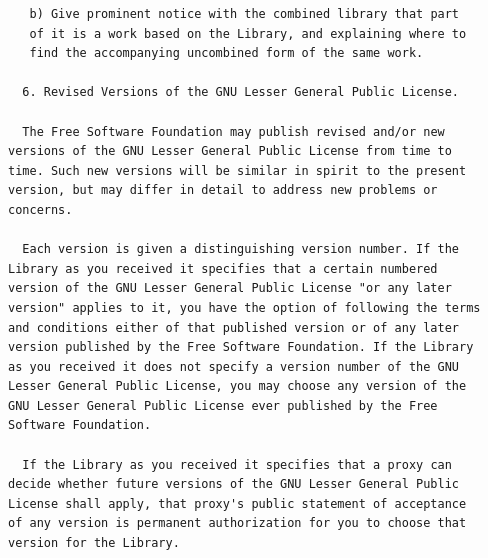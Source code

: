 \documentclass[11pt,twoside,fleqn,openright,titlepage]{cslreport}
\begin{document}
\begin{small}
\begin{verbatim}
   b) Give prominent notice with the combined library that part
   of it is a work based on the Library, and explaining where to
   find the accompanying uncombined form of the same work.

  6. Revised Versions of the GNU Lesser General Public License.

  The Free Software Foundation may publish revised and/or new
versions of the GNU Lesser General Public License from time to 
time. Such new versions will be similar in spirit to the present
version, but may differ in detail to address new problems or 
concerns.

  Each version is given a distinguishing version number. If the
Library as you received it specifies that a certain numbered
version of the GNU Lesser General Public License "or any later
version" applies to it, you have the option of following the terms
and conditions either of that published version or of any later
version published by the Free Software Foundation. If the Library
as you received it does not specify a version number of the GNU
Lesser General Public License, you may choose any version of the
GNU Lesser General Public License ever published by the Free 
Software Foundation.

  If the Library as you received it specifies that a proxy can
decide whether future versions of the GNU Lesser General Public
License shall apply, that proxy's public statement of acceptance
of any version is permanent authorization for you to choose that
version for the Library.
\end{verbatim}
\end{small}
\end{document}
